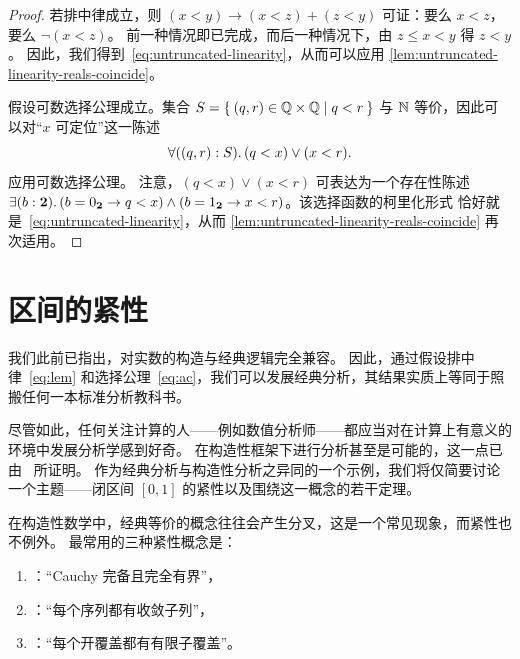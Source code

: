 \begin{proof}
  若排中律成立，则 $(x < y) \to (x < z) + (z < y)$ 可证：要么 $x < z$，要么 $\lnot (x < z)$。
  前一种情况即已完成，而后一种情况下，由 $z \leq x < y$ 得 $z < y$。
  因此，我们得到~\eqref{eq:untruncated-linearity}，从而可以应用 \cref{lem:untruncated-linearity-reals-coincide}。

  假设可数选择公理成立。集合 $S = \setof{ \pairr{q, r} \in \Q \times \Q | q <
    r }$ 与 $\mathbb{N}$ 等价，因此可以对``$x$ 可定位''这一陈述
  \begin{equation*}
    \fall{\pairr{q, r} : S} (q < x) \lor (x < r).
  \end{equation*}
  应用可数选择公理。
  注意，$(q < x) \lor (x < r)$ 可表达为一个存在性陈述 $\exis{b :
    \bool} (b = \bfalse \to q < x) \land (b = \btrue \to x < r)$。该选择函数的柯里化形式
  恰好就是~\eqref{eq:untruncated-linearity}，从而
  \cref{lem:untruncated-linearity-reals-coincide} 再次适用。
\end{proof}

%
%
%


\section{区间的紧性}
\label{sec:compactness-interval}

%
%

我们此前已指出，对实数的构造与经典逻辑完全兼容。
因此，通过假设排中律~\eqref{eq:lem} 和选择公理~\eqref{eq:ac}，我们可以发展经典分析，其结果实质上等同于照搬任何一本标准分析教科书。

%
%
尽管如此，任何关注计算的人——例如数值分析师——都应当对在计算上有意义的环境中发展分析学感到好奇。
在构造性框架下进行分析甚至是可能的，这一点已由~\cite{Bishop1967} 所证明。
作为经典分析与构造性分析之异同的一个示例，我们将仅简要讨论一个主题——闭区间 $[0,1]$ 的紧性以及围绕这一概念的若干定理。

在构造性数学中，经典等价的概念往往会产生分叉，这是一个常见现象，而紧性也不例外。
最常用的三种紧性概念是：
%
%


\begin{enumerate}
\item {}：“Cauchy 完备且完全有界”，
\item {}：“每个序列都有收敛子列”，
\item {}：“每个开覆盖都有有限子覆盖”。
\end{enumerate}


